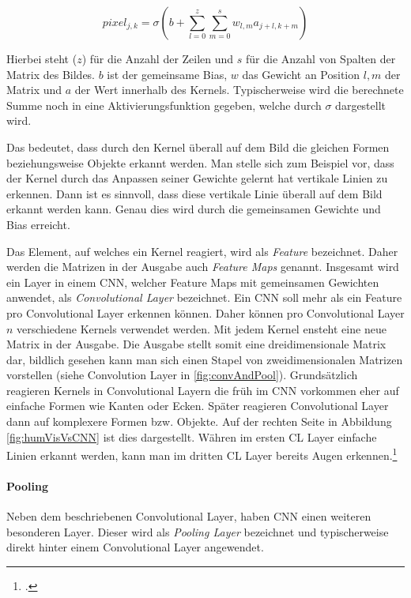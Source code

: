 \begin{equation}
    \label{eq:actSharedWeights}
    pixel_{j,k} = \sigma\left(b+\sum_{l=0}^{z} \sum_{m=0}^{s} w_{l, m} a_{j+l, k+m}\right)
\end{equation}

Hierbei steht ($z$) für die Anzahl der Zeilen und $s$ für die Anzahl von Spalten der Matrix des Bildes. $b$ ist der gemeinsame Bias, $w$ das Gewicht an Position $l,m$ der Matrix und $a$ der Wert innerhalb des Kernels. Typischerweise wird die berechnete Summe noch in eine Aktivierungsfunktion gegeben, welche durch $\sigma$ dargestellt wird.

Das bedeutet, dass durch den Kernel überall auf dem Bild die gleichen Formen beziehungsweise Objekte erkannt werden. Man stelle sich zum Beispiel vor, dass der Kernel durch das Anpassen seiner Gewichte gelernt hat vertikale Linien zu erkennen. Dann ist es sinnvoll, dass diese vertikale Linie überall auf dem Bild erkannt werden kann. Genau dies wird durch die gemeinsamen Gewichte und Bias erreicht.

Das Element, auf welches ein Kernel reagiert, wird als \textit{Feature} bezeichnet. Daher werden die Matrizen in der Ausgabe auch \textit{Feature Maps} genannt. Insgesamt wird ein Layer in einem \ac{CNN}, welcher Feature Maps mit gemeinsamen Gewichten anwendet, als \textit{Convolutional Layer} bezeichnet. Ein \ac{CNN} soll mehr als ein Feature pro Convolutional Layer erkennen können. Daher können pro Convolutional Layer $n$ verschiedene Kernels verwendet werden. Mit jedem Kernel ensteht eine neue Matrix in der Ausgabe. Die Ausgabe stellt somit eine dreidimensionale Matrix dar, bildlich gesehen kann man sich einen Stapel von zweidimensionalen Matrizen vorstellen (siehe Convolution Layer in \ref{fig:convAndPool}).
Grundsätzlich reagieren Kernels in Convolutional Layern die früh im \ac{CNN} vorkommen eher auf einfache Formen wie Kanten oder Ecken. Später reagieren Convolutional Layer dann auf komplexere Formen bzw. Objekte. Auf der rechten Seite in Abbildung \ref{fig:humVisVsCNN} ist dies dargestellt. Währen im ersten CL Layer einfache Linien erkannt werden, kann man im dritten CL Layer bereits Augen erkennen.\footcite[Vgl.][S. 169-171]{nielsenNeuralNetworksDeep2015}

\paragraph{Pooling}
Neben dem beschriebenen Convolutional Layer, haben \ac{CNN} einen weiteren besonderen Layer. Dieser wird als \textit{Pooling Layer} bezeichnet und typischerweise direkt hinter einem Convolutional Layer angewendet. 

